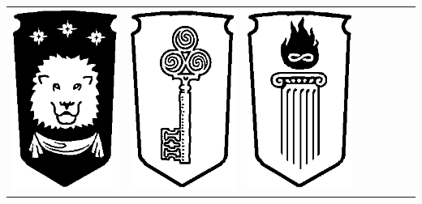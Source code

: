 \begin{center}
\begin{tabular}{@{}cccccccc@{}}
\includegraphics[width=\finallogosize]{pics/logo_huntsman.png} &
\includegraphics[width=\finallogosize]{pics/logo_scholar.png} &
\includegraphics[width=\finallogosize]{pics/logo_fieryheart.png} \tabularnewline
\end{tabular}
\end{center}

